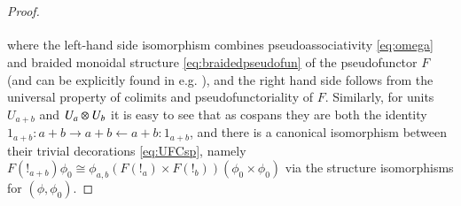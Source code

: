 \documentclass[reqno]{amsart}
\begin{document}
\begin{proof}
\begin{equation}
{\begin{tikzcd}[ampersand replacement=\&,column sep=.3in,row sep=.1in]
\end{tikzcd}}
\end{equation}
where the left-hand side isomorphism combines pseudoassociativity \cref{eq:omega} and braided monoidal structure \cref{eq:braidedpseudofun} of the pseudofunctor $F$ (and can be explicitly found in e.g. \cite[Page 125]{DS}), and the right hand side follows from the universal property of colimits and pseudofunctoriality of $F$.
Similarly, for units $U_{a+b}$ and $U_a\otimes U_b$ it is easy to see that as cospans they are both the identity $1_{a+b}:a+b\to a+b\leftarrow a+b:1_{a+b}$, and there is a canonical isomorphism between their trivial decorations \cref{eq:UFCsp}, namely $F(!_{a+b})\phi_0\cong\phi_{a,b}(F(!_a)\times F(!_b))(\phi_0\times\phi_0)$ via the structure isomorphisms for $(\phi,\phi_0)$.
\begin{comment}
, the first of which relates the double functor $\otimes$ with the functor $\odot$ and the second of which relates the double functor $\otimes$ with the functor $U$. 
The latter of these is easy to see: given two objects $a$ and $b$ in $F\lCsp_0=\A$, $\mu$ is given by the identity map of cospans in $\A$:
\[
\begin{tikzpicture}[scale=1.5]
\node (A) at (0,0.5) {$a+b$};
\node (A') at (0,-0.5) {$a+b$};
\node (B) at (2,0.5) {$a+b$};
\node (C) at (4,0.5) {$a+b$};
\node (C') at (4,-0.5) {$a+b$};
\node (D) at (2,-0.5) {$a+b$};
\node (E) at (5.5,0.5) {$\bot_{a+b} \in F(a+b)$};
\node (F) at (5.5,-0.5) {$\bot_a + \bot_b \in F(a+b)$};
\path[->,font=\scriptsize,>=angle 90]
(A) edge node[above]{$1_{a+b}$} (B)
(C) edge node[above]{$1_{a+b}$} (B)
(A) edge node[left]{$1$} (A')
(C) edge node[right]{$1$} (C')
(A') edge node [above]{$1_a + 1_b$} (D)
(C') edge node [above]{$1_a + 1_b$} (D)
(B) edge node [left] {$1$} (D);
\end{tikzpicture}
\]
together with the decoration isomorphism $\tau_{a,b} \maps \bot_{a+b} \xrightarrow{\sim} \bot_a + \bot_b$ given by the unique map between the two initial objects $\bot_{a+b}$ and $\bot_a + \bot_b$ in $F(a+b)$. 
For the former globular 2-morphism $\chi$, we first introduce some notation for objects $M_1,M_2,N_1$ and $N_2$ of $F\lCsp_1$:
\[
\begin{tikzpicture}[scale=1.5]
\node (A) at (0,0) {$a$};
\node (B) at (1,0) {$m_1$};
\node (C) at (2,0) {$b$};
\node (D) at (1,-0.5) {$x_1 \in F(m_1)$};

\end{comment}
\end{proof}
\end{document}
